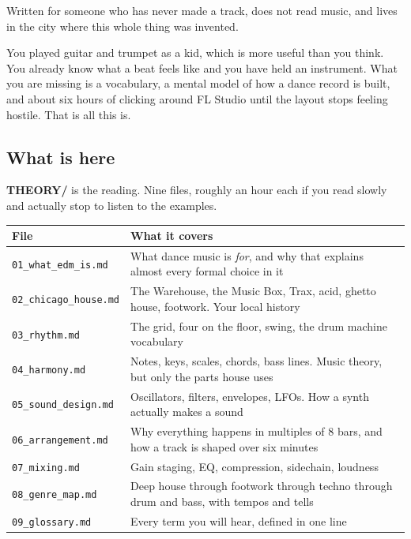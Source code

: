 Written for someone who has never made a track, does not read music, and lives in the city
where this whole thing was invented.

You played guitar and trumpet as a kid, which is more useful than you think. You already
know what a beat feels like and you have held an instrument. What you are missing is a
vocabulary, a mental model of how a dance record is built, and about six hours of clicking
around FL Studio until the layout stops feeling hostile. That is all this is.

\subsection{What is here}\label{00_how_to_use-what-is-here}

\textbf{THEORY/} is the reading. Nine files, roughly an hour each if you read slowly and
actually stop to listen to the examples.

{\def\LTcaptype{none} %
\begin{longtable}[]{@{}>{\raggedright\arraybackslash}p{}>{\raggedright\arraybackslash}p{}@{}}
\toprule\noalign{}
File & What it covers \\
\midrule\noalign{}
\endhead
\bottomrule\noalign{}
\endlastfoot
\texttt{01\_what\_edm\_is.md} & What dance music is \emph{for}, and why that explains almost every formal choice in it \\
\texttt{02\_chicago\_house.md} & The Warehouse, the Music Box, Trax, acid, ghetto house, footwork. Your local history \\
\texttt{03\_rhythm.md} & The grid, four on the floor, swing, the drum machine vocabulary \\
\texttt{04\_harmony.md} & Notes, keys, scales, chords, bass lines. Music theory, but only the parts house uses \\
\texttt{05\_sound\_design.md} & Oscillators, filters, envelopes, LFOs. How a synth actually makes a sound \\
\texttt{06\_arrangement.md} & Why everything happens in multiples of 8 bars, and how a track is shaped over six minutes \\
\texttt{07\_mixing.md} & Gain staging, EQ, compression, sidechain, loudness \\
\texttt{08\_genre\_map.md} & Deep house through footwork through techno through drum and bass, with tempos and tells \\
\texttt{09\_glossary.md} & Every term you will hear, defined in one line \\
\end{longtable}
}

